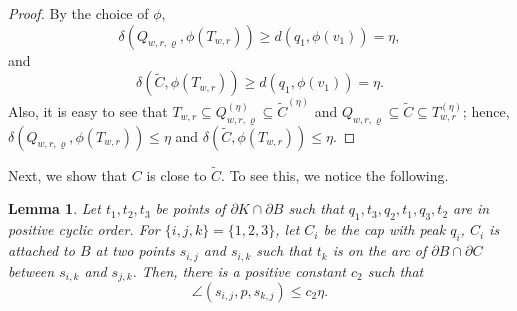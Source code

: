 \documentclass[12pt,reqno]{amsart}
\newtheorem{lemma}[theorem]{Lemma}
\theoremstyle{remark}
\begin{document}
\begin{proof}
By the choice of $\phi$, 
$$\delta(Q_{w,r,\varrho},\phi(T_{w,r}))\geq d(q_1,\phi(v_1))=\eta,$$ and 
$$\delta(\widetilde{C},\phi(T_{w,r}))\geq d(q_1,\phi(v_1))=\eta.$$ Also, it is easy to see that $T_{w,r}\subseteq Q_{w,r,\varrho}^{(\eta)}\subseteq\widetilde{C}^{(\eta)}$ and $Q_{w,r,\varrho}\subseteq\widetilde{C}\subseteq T_{w,r}^{(\eta)}$; hence, $\delta(Q_{w,r,\varrho},\phi(T_{w,r}))\leq\eta$ and $\delta(\widetilde{C},\phi(T_{w,r}))\leq\eta$.
\end{proof}

Next, we show that $C$ is close to $\widetilde{C}$. To see this, we notice the following.

\begin{lemma}\label{lem:angles-are-close}
Let $t_1,t_2,t_3$ be points of $\partial K\cap\partial B$ such that $q_1,t_3,q_2,t_1,q_3,t_2$ are in positive cyclic order. For $\{i,j,k\}=\{1,2,3\}$, let $C_i$ be the cap with peak $q_i$, $C_i$ is attached to $B$ at two points $s_{i,j}$ and $s_{i,k}$ such that $t_k$ is on the arc of $\partial B\cap \partial C$ between $s_{i,k}$ and $s_{j,k}$. Then, there is a positive constant $c_2$ such that
\begin{equation}\label{eq:anglebound}
\angle(s_{i,j},p,s_{k,j})\leq c_2\eta.
\end{equation}
\end{lemma}
\end{document}

